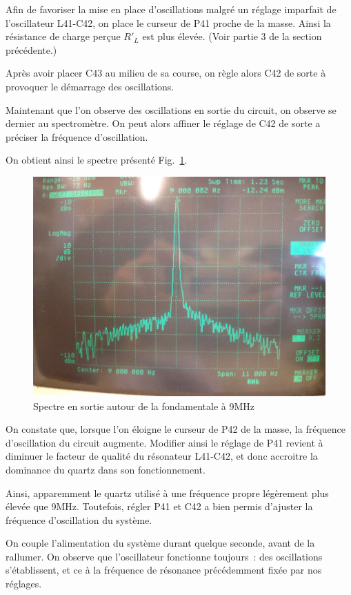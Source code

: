 \documentclass{article}
\begin{document}

Afin de favoriser la mise en place d'oscillations malgré un réglage imparfait de l'oscillateur L41-C42, on place le curseur de P41 proche de la masse. Ainsi la résistance de charge perçue $R'_L$ est plus élevée. (Voir partie 3 de la section précédente.)

Après avoir placer C43 au milieu de sa course, on règle alors C42 de sorte à provoquer le démarrage des oscillations.



Maintenant que l'on observe des oscillations en sortie du circuit, on observe se dernier au spectromètre. On peut alors affiner le réglage de C42 de sorte a préciser la fréquence d'oscillation.

On obtient ainsi le spectre présenté Fig.~\ref{fig:osc_quartz_spectre}.

\begin{figure}[h]
	\centering
	\includegraphics[width = 0.7\linewidth]{7_3_3_spectre9MHz.jpg}
	\caption{Spectre en sortie autour de la fondamentale à 9MHz}
	\label{fig:osc_quartz_spectre}
\end{figure}



On constate que, lorsque l'on éloigne le curseur de P42 de la masse, la fréquence d'oscillation du circuit augmente. Modifier ainsi le réglage de P41 revient à diminuer le facteur de qualité du résonateur L41-C42, et donc accroitre la dominance du quartz dans son fonctionnement. 

Ainsi, apparemment le quartz utilisé à une fréquence propre légèrement plus élevée que 9MHz. Toutefois, régler P41 et C42 a bien permis d'ajuster la fréquence d'oscillation du système.



On couple l'alimentation du système durant quelque seconde, avant de la rallumer. On observe que l'oscillateur fonctionne toujours~: des oscillations s'établissent, et ce à la fréquence de résonance précédemment fixée par nos réglages.
\end{document}
